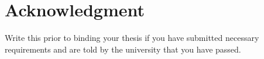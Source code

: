 \chapter*{Acknowledgment}

	Write this prior to binding your thesis if you have submitted necessary requirements and are told by the university that you have passed.

